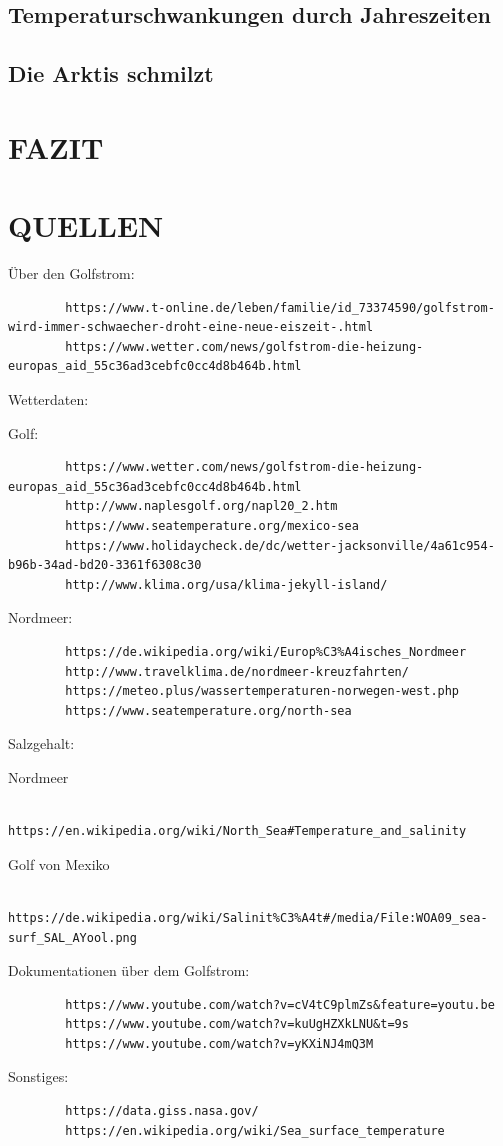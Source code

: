 \documentclass[a4paper,twoside]{article}
\begin{document}
	\subsection{Temperaturschwankungen durch Jahreszeiten}
	
	\subsection{Die Arktis schmilzt}
	
	\section{\uppercase{Fazit}}\label{sec:Fazit}
	
	
 	\section{\uppercase{Quellen}}\label{sec: Quellen}
	\noindent Über den Golfstrom: 
	\begin{verbatim}
		https://www.t-online.de/leben/familie/id_73374590/golfstrom-wird-immer-schwaecher-droht-eine-neue-eiszeit-.html
		https://www.wetter.com/news/golfstrom-die-heizung-europas_aid_55c36ad3cebfc0cc4d8b464b.html
	\end{verbatim}
	Wetterdaten: 
	
	\noindent Golf:
	\begin{verbatim}
		https://www.wetter.com/news/golfstrom-die-heizung-europas_aid_55c36ad3cebfc0cc4d8b464b.html
		http://www.naplesgolf.org/napl20_2.htm
		https://www.seatemperature.org/mexico-sea
		https://www.holidaycheck.de/dc/wetter-jacksonville/4a61c954-b96b-34ad-bd20-3361f6308c30  
		http://www.klima.org/usa/klima-jekyll-island/
	\end{verbatim}
	Nordmeer:
	\begin{verbatim}
		https://de.wikipedia.org/wiki/Europ%C3%A4isches_Nordmeer
		http://www.travelklima.de/nordmeer-kreuzfahrten/
		https://meteo.plus/wassertemperaturen-norwegen-west.php
		https://www.seatemperature.org/north-sea
	\end{verbatim}
	Salzgehalt:
	
	\noindent Nordmeer
	\begin{verbatim}
		https://en.wikipedia.org/wiki/North_Sea#Temperature_and_salinity
	\end{verbatim}
	Golf von Mexiko
	\begin{verbatim}
	https://de.wikipedia.org/wiki/Salinit%C3%A4t#/media/File:WOA09_sea-surf_SAL_AYool.png
	\end{verbatim}		
	
	Dokumentationen über dem Golfstrom: 
	\begin{verbatim}
		https://www.youtube.com/watch?v=cV4tC9plmZs&feature=youtu.be
		https://www.youtube.com/watch?v=kuUgHZXkLNU&t=9s
		https://www.youtube.com/watch?v=yKXiNJ4mQ3M
  	\end{verbatim}		
	Sonstiges: 
	\begin{verbatim}
		https://data.giss.nasa.gov/
		https://en.wikipedia.org/wiki/Sea_surface_temperature
	\end{verbatim}
	
	\nocite{*}
	
	
\end{document}
